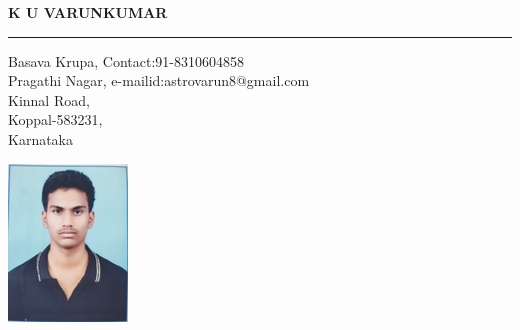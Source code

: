 \documentclass[10pt,letterpaper]{article}
\begin{document}
\begin{center}
\huge 
\textbf {K U VARUNKUMAR}
\end{center}


\hrule
\vspace{1.0em}
Basava Krupa, \hspace{31.8em} Contact:91-8310604858\\ Pragathi Nagar, \hfill e-mailid:astrovarun8@gmail.com \\ Kinnal Road,\\ Koppal-583231,\\Karnataka

\hfill \includegraphics{varun}

\vspace{5.0em}
\end{document}
